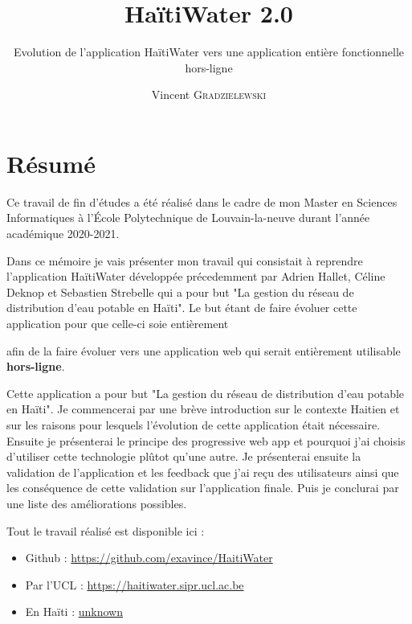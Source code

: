 \documentclass{EPL-master-thesis-covers-FR}
\title{HaïtiWater 2.0}
\subtitle{Evolution de l'application HaïtiWater vers une application entière  fonctionnelle hors-ligne}
\author{Vincent \textsc{Gradzielewski}}%
\begin{document}
	\maketitle
	\tableofcontents

	\setlength{\parskip}{1.5em plus1em minus1em}


	\chapter*{Résumé}
	
	
		Ce travail de fin d'études a été réalisé dans le cadre de mon Master en Sciences Informatiques à l'École Polytechnique de Louvain-la-neuve durant l'année académique 2020-2021.
		
		Dans ce mémoire je vais présenter mon travail qui consistait à reprendre l'application HaïtiWater développée précedemment par Adrien Hallet, Céline Deknop et Sebastien Strebelle qui a pour but "La gestion du réseau de distribution d'eau potable en Haïti". Le but étant de faire évoluer cette application pour que celle-ci soie entièrement
		
		
		 afin de la faire évoluer vers une application web qui serait entièrement utilisable \textbf{hors-ligne}.
		 
		Cette application a pour but "La gestion du réseau de distribution d'eau potable en Haïti". Je commencerai par une brève introduction sur le contexte Haitien et sur les raisons pour lesquels l'évolution de cette application était nécessaire. Ensuite je présenterai le principe des progressive web app et pourquoi j'ai choisis d'utiliser cette technologie plûtot qu'une autre. Je présenterai ensuite la validation de l'application et les feedback que j'ai reçu des utilisateurs ainsi que les conséquence de cette validation sur l'application finale. Puis je conclurai par une liste des améliorations possibles.

		Tout le travail réalisé est disponible ici :

\begin{itemize}
	\item Github : \url{https://github.com/exavince/HaitiWater}
	\item Par l'UCL : \url{https://haitiwater.sipr.ucl.ac.be}
	\item En Haïti : \url{unknown}
\end{itemize}		
\end{document}
